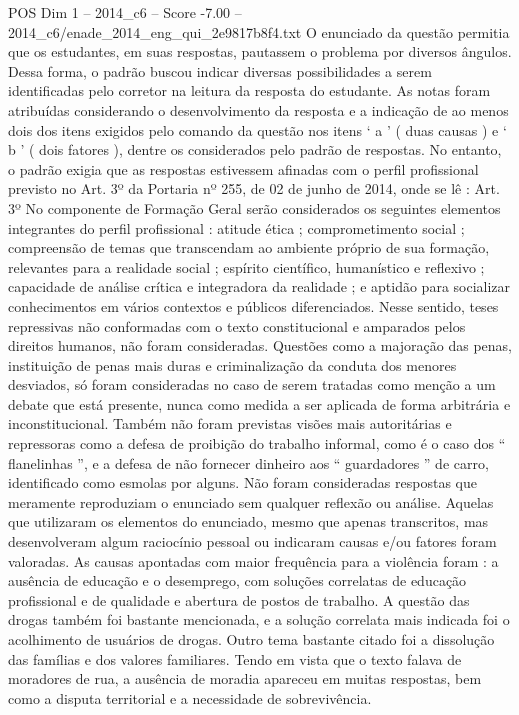 \begin{textsample}{POS Dim 1 – 2014\_c6 – Score -7.00 – 2014\_c6/enade\_2014\_eng\_qui\_2e9817b8f4.txt}
O enunciado da questão permitia que os estudantes, em suas respostas, pautassem o problema por diversos ângulos.
Dessa forma, o padrão buscou indicar diversas possibilidades a serem identificadas pelo corretor na leitura da resposta do estudante.
As notas foram atribuídas considerando o desenvolvimento da resposta e a indicação de ao menos dois dos itens exigidos pelo comando da questão nos itens ‘ a ’ ( duas causas ) e ‘ b ’ ( dois fatores ), dentre os considerados pelo padrão de respostas.
No entanto, o padrão exigia que as respostas estivessem afinadas com o perfil profissional previsto no Art. 3º da Portaria nº 255, de 02 de junho de 2014, onde se lê : Art. 3º No componente de Formação Geral serão considerados os seguintes elementos integrantes do perfil profissional : atitude ética ; comprometimento social ; compreensão de temas que transcendam ao ambiente próprio de sua formação, relevantes para a realidade social ; espírito científico, humanístico e reflexivo ; capacidade de análise crítica e integradora da realidade ; e aptidão para socializar conhecimentos em vários contextos e públicos diferenciados.
Nesse sentido, teses repressivas não conformadas com o texto constitucional e amparados pelos direitos humanos, não foram consideradas.
Questões como a majoração das penas, instituição de penas mais duras e criminalização da conduta dos menores desviados, só foram consideradas no caso de serem tratadas como menção a um debate que está presente, nunca como medida a ser aplicada de forma arbitrária e inconstitucional.
Também não foram previstas visões mais autoritárias e repressoras como a defesa de proibição do trabalho informal, como é o caso dos “ flanelinhas ”, e a defesa de não fornecer dinheiro aos “ guardadores ” de carro, identificado como esmolas por alguns.
Não foram consideradas respostas que meramente reproduziam o enunciado sem qualquer reflexão ou análise.
Aquelas que utilizaram os elementos do enunciado, mesmo que apenas transcritos, mas desenvolveram algum raciocínio pessoal ou indicaram causas e/ou fatores foram valoradas.
As causas apontadas com maior frequência para a violência foram : a ausência de educação e o desemprego, com soluções correlatas de educação profissional e de qualidade e abertura de postos de trabalho.
A questão das drogas também foi bastante mencionada, e a solução correlata mais indicada foi o acolhimento de usuários de drogas.
Outro tema bastante citado foi a dissolução das famílias e dos valores familiares.
Tendo em vista que o texto falava de moradores de rua, a ausência de moradia apareceu em muitas respostas, bem como a disputa territorial e a necessidade de sobrevivência.

\end{textsample}
